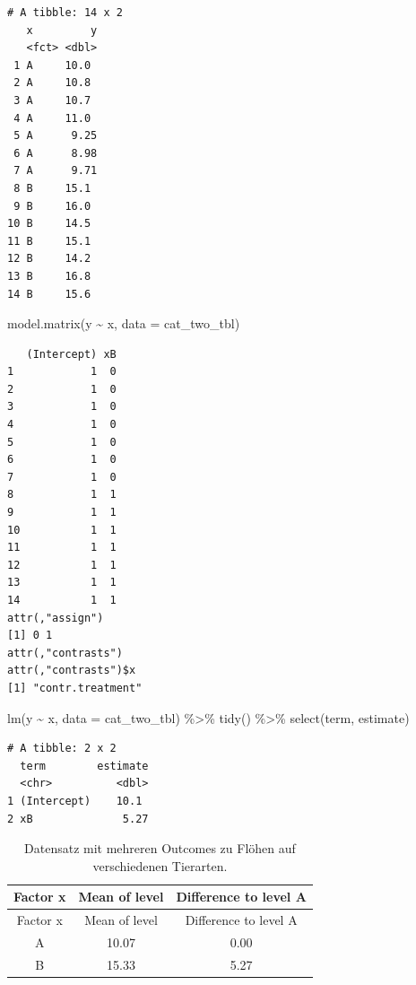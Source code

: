 \documentclass[
  letterpaper,
]{scrbook}
\newenvironment{Shaded}{\begin{snugshade}}{\end{snugshade}}
\newcommand{\AttributeTok}[1]{\textcolor[rgb]{0.40,0.45,0.13}{#1}}
\newcommand{\FunctionTok}[1]{\textcolor[rgb]{0.28,0.35,0.67}{#1}}
\newcommand{\NormalTok}[1]{\textcolor[rgb]{0.00,0.23,0.31}{#1}}
\newcommand{\SpecialCharTok}[1]{\textcolor[rgb]{0.37,0.37,0.37}{#1}}
\begin{document}
\begin{verbatim}
# A tibble: 14 x 2
   x         y
   <fct> <dbl>
 1 A     10.0 
 2 A     10.8 
 3 A     10.7 
 4 A     11.0 
 5 A      9.25
 6 A      8.98
 7 A      9.71
 8 B     15.1 
 9 B     16.0 
10 B     14.5 
11 B     15.1 
12 B     14.2 
13 B     16.8 
14 B     15.6 
\end{verbatim}

\begin{Shaded}
\begin{Highlighting}[]
\FunctionTok{model.matrix}\NormalTok{(y }\SpecialCharTok{\textasciitilde{}}\NormalTok{ x, }\AttributeTok{data =}\NormalTok{ cat\_two\_tbl)}
\end{Highlighting}
\end{Shaded}

\begin{verbatim}
   (Intercept) xB
1            1  0
2            1  0
3            1  0
4            1  0
5            1  0
6            1  0
7            1  0
8            1  1
9            1  1
10           1  1
11           1  1
12           1  1
13           1  1
14           1  1
attr(,"assign")
[1] 0 1
attr(,"contrasts")
attr(,"contrasts")$x
[1] "contr.treatment"
\end{verbatim}

\begin{Shaded}
\begin{Highlighting}[]
\FunctionTok{lm}\NormalTok{(y }\SpecialCharTok{\textasciitilde{}}\NormalTok{ x, }\AttributeTok{data =}\NormalTok{ cat\_two\_tbl) }\SpecialCharTok{\%\textgreater{}\%} 
  \FunctionTok{tidy}\NormalTok{() }\SpecialCharTok{\%\textgreater{}\%} 
  \FunctionTok{select}\NormalTok{(term, estimate)}
\end{Highlighting}
\end{Shaded}

\begin{verbatim}
# A tibble: 2 x 2
  term        estimate
  <chr>          <dbl>
1 (Intercept)    10.1 
2 xB              5.27
\end{verbatim}

\hypertarget{tbl-cat-2}{}
\begin{longtable}[]{@{}ccc@{}}
\caption{\label{tbl-cat-2}Datensatz mit mehreren Outcomes zu Flöhen auf
verschiedenen Tierarten.}\tabularnewline
\toprule()
Factor x & Mean of level & Difference to level A \\
\midrule()
\endfirsthead
\toprule()
Factor x & Mean of level & Difference to level A \\
\midrule()
\endhead
A & 10.07 & 0.00 \\
B & 15.33 & 5.27 \\
\bottomrule()
\end{longtable}
\end{document}
